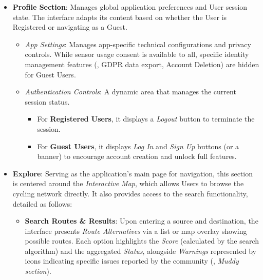 \begin{itemize}
    \item \textbf{Profile Section}: 
    Manages global application preferences and User session state. The interface adapts its content based on whether the User is Registered or navigating as a Guest.
    \begin{itemize}
        \item \emph{App Settings}: Manages app-specific technical configurations and privacy controls. While sensor usage consent is available to all, specific identity management features (\eg, GDPR data export, Account Deletion) are hidden for Guest Users.
        \item \emph{Authentication Controls}: A dynamic area that manages the current session status.
        \begin{itemize}
            \item For \textbf{Registered Users}, it displays a \emph{Logout} button to terminate the session.
            \item For \textbf{Guest Users}, it displays \emph{Log In} and \emph{Sign Up} buttons (or a banner) to encourage account creation and unlock full features.
        \end{itemize}
    \end{itemize}
    
    \item \textbf{Explore}: Serving as the application's main page for navigation, this section is centered around the \emph{Interactive Map}, which allows Users to browse the cycling network directly. It also provides access to the search functionality, detailed as follows:
    \begin{itemize}
        \item \textbf{Search Routes \& Results}: Upon entering a source and destination, the interface presents \emph{Route Alternatives} via a list or map overlay showing possible routes. Each option highlights the \emph{Score} (calculated by the search algorithm) and the aggregated \emph{Status}, alongside \emph{Warnings} represented by icons indicating specific issues reported by the community (\eg, \emph{Muddy section}).
    \end{itemize}


\end{itemize}
